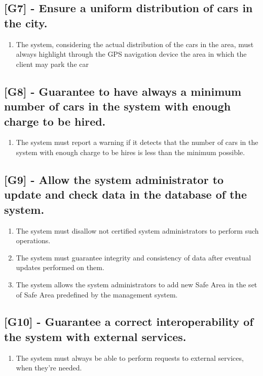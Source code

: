\subsection{[G7] - Ensure a uniform distribution of cars in the city.}
\begin{enumerate}[label=R7.\arabic*]
\item The system, considering the actual distribution of the cars in the area, must always highlight through the GPS navigation device the area in which the client may park the car
\end{enumerate}

\subsection{[G8] - Guarantee to have always a minimum number of cars in the system with enough charge to be hired.}
\begin{enumerate}[label=R8.\arabic*]
\item The system must report a warning if it detects that the number of cars in the system with enough charge to be hires is less than the minimum possible.
\end{enumerate}

\subsection{[G9] - Allow the system administrator to update and check data in the database of the system.}
\begin{enumerate}[label=R9.\arabic*]
\item The system must disallow not certified system administrators to perform such operations.
\item The system must guarantee integrity and consistency of data after eventual updates performed on them.
\item The system allows the system administrators to add new Safe Area in the set of Safe Area predefined by the management system.
\end{enumerate}

\subsection{[G10] - Guarantee a correct interoperability of the system with external services.}
\begin{enumerate}[label=R10.\arabic*]
\item The system must always be able to perform requests to external services, when they’re needed.
\end{enumerate}

